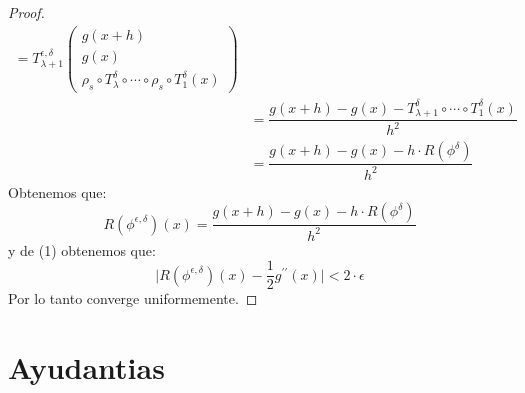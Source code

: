 \documentclass[12pt,a4paper]{book}
\providecommand{\abs}[1]{\lvert#1\rvert}
\begin{document}
\begin{proof}
\begin{equation*}
\begin{split}
=T_{\lambda +1}^{\epsilon,\delta}\left(\begin{matrix}
g(x+h) \\
g(x) \\
\rho_{s}\circ T_{\lambda}^{\delta}\circ\cdots\circ\rho_{s}\circ T_{1}^{\delta}(x)
\end{matrix}\right)\\&
=\dfrac{g(x+h)-g(x)-T_{\lambda +1}^{\delta}\circ\cdots\circ T_{1}^{\delta}(x)}{h^{2}}\\&
=\dfrac{g(x+h)-g(x)-h\cdot R(\phi^{\delta})}{h^{2}}
\end{split}
\end{equation*}
Obtenemos que:
$$R(\phi^{\epsilon,\delta})(x)=\dfrac{g(x+h)-g(x)-h\cdot R(\phi^{\delta})}{h^{2}}$$
y de (1) obtenemos que:
$$\abs{R(\phi^{\epsilon,\delta})(x)-\frac{1}{2}g^{\prime\prime}(x)} < 2\cdot \epsilon$$
Por lo tanto converge uniformemente.
\end{proof}




\part{Ayudantias}
\end{document}
